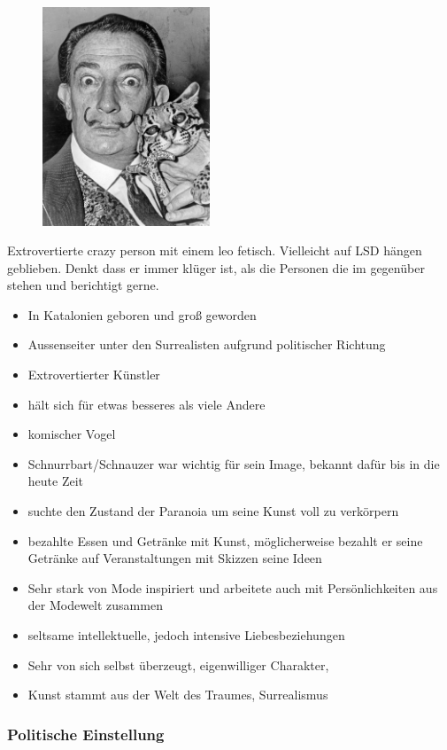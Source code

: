\documentclass[12pt, a4paper, openany]{report}
\begin{document}
\begin{figure}[h!]
\centering
\includegraphics[width=5cm]{Salvador-Dali.jpg}
\end{figure}
Extrovertierte crazy person mit einem leo fetisch.  Vielleicht auf LSD hängen geblieben. Denkt dass er immer klüger ist, als die Personen die im gegenüber stehen und berichtigt gerne.

\begin{itemize}
  \item In Katalonien geboren und groß geworden
  \item Aussenseiter unter den Surrealisten aufgrund politischer Richtung
  \item Extrovertierter Künstler
  \item hält sich für etwas besseres als viele Andere
  \item komischer Vogel
  \item Schnurrbart/Schnauzer war wichtig für sein Image, bekannt dafür bis in die heute Zeit
  \item suchte den Zustand der Paranoia um seine Kunst voll zu verkörpern
  \item bezahlte Essen und Getränke mit Kunst, möglicherweise bezahlt er seine Getränke auf Veranstaltungen mit Skizzen seine Ideen
  \item Sehr stark von Mode inspiriert und arbeitete auch mit Persönlichkeiten aus der Modewelt zusammen
  \item seltsame intellektuelle, jedoch intensive Liebesbeziehungen 
  \item Sehr von sich selbst überzeugt, eigenwilliger Charakter, 
  \item Kunst stammt aus der Welt des Traumes, Surrealismus
\end{itemize}

\subsubsection{Politische Einstellung}
\end{document}
